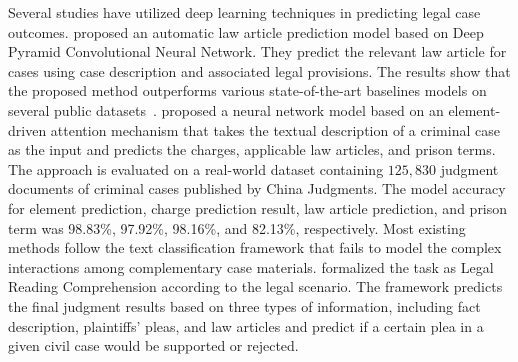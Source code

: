 \documentclass[sn-mathphys,Numbered]{sn-jnl}%
\theoremstyle{thmstyleone}%
\theoremstyle{thmstyletwo}%
\theoremstyle{thmstylethree}%
\begin{document}


Several studies have utilized deep learning techniques in predicting legal case outcomes. \citet{Zhang2019ApplyingDD} proposed an automatic law article prediction model based on Deep Pyramid Convolutional Neural Network. They predict the relevant law article for cases using case description and associated legal provisions. %
The results show that the proposed method outperforms various state-of-the-art baselines models on several public datasets~\cite{xiao2018cail2018}.  \citet{li2019element} %
proposed a neural network model based on an element-driven attention mechanism that takes the textual description of a criminal case as the input and predicts the charges, applicable law articles, and prison terms. The approach is evaluated on a real-world dataset containing $125,830$ judgment documents of criminal cases published by China Judgments. %
The model accuracy for element prediction, charge prediction result, law article prediction, and prison term was 98.83\%, 97.92\%, 98.16\%, and 82.13\%, respectively. Most existing methods follow the text classification framework that fails to model the complex interactions among complementary case materials.  \citet{long2019automatic} formalized the task as Legal Reading Comprehension according to the legal scenario. The framework predicts the final judgment results based on three types of information, including fact description, plaintiffs’ pleas, and law articles and predict if a certain plea in a given civil case would be supported or rejected. %
\end{document}
